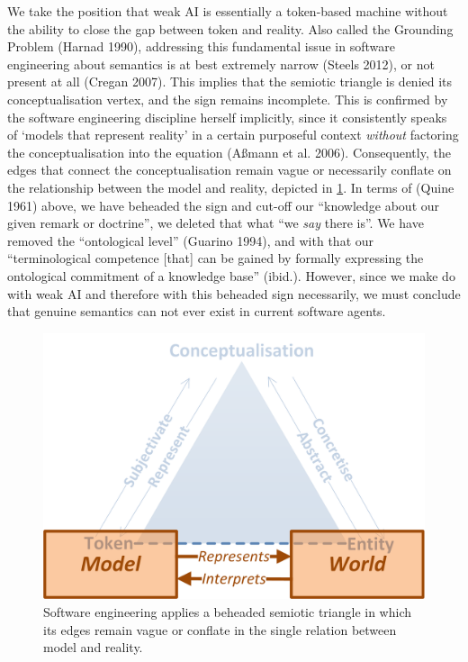 \documentclass[a4paper,11pt,oneside,oldfontcommands]{memoir}
\theoremstyle{definition}
\theoremstyle{break}		%
\numberwithin{equation}{chapter}
\numberwithin{figure}{chapter}
\begin{document}
We take the position that weak AI is essentially a token-based machine
without the ability to close the gap between token and reality. Also
called the Grounding Problem (Harnad 1990), addressing this fundamental
issue in software engineering about semantics is at best extremely
narrow (Steels 2012), or not present at all (Cregan 2007). This implies
that the semiotic triangle is denied its conceptualisation vertex, and
the sign remains incomplete. This is confirmed by the software
engineering discipline herself implicitly, since it consistently speaks
of `models that represent reality' in a certain purposeful context
\emph{without} factoring the conceptualisation into the equation (Aßmann
et al. 2006). Consequently, the edges that connect the conceptualisation
remain vague or necessarily conflate on the relationship between the
model and reality, depicted in \cref{fig:software-models-reality}. In
terms of (Quine 1961) above, we have beheaded the sign and cut-off our
``knowledge about our given remark or doctrine'', we deleted that what
``we \emph{say} there is''. We have removed the ``ontological level''
(Guarino 1994), and with that our ``terminological competence {[}that{]}
can be gained by formally expressing the ontological commitment of a
knowledge base'' (ibid.). However, since we make do with weak AI and
therefore with this beheaded sign necessarily, we must conclude that
genuine semantics can not ever exist in current software agents.

\begin{figure}
\hypertarget{fig:software-models-reality}{%
\centering
\includegraphics{src/images/SoftwareModelsReality.png}
\caption{Software engineering applies a beheaded semiotic triangle in
which its edges remain vague or conflate in the single relation between
model and reality.}\label{fig:software-models-reality}
}
\end{figure}
\end{document}
